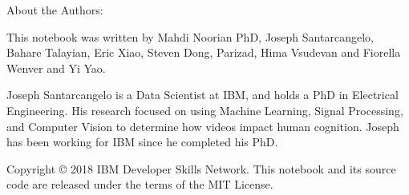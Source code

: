 \documentclass[11pt]{article}
\begin{document}
    About the Authors:

This notebook was written by Mahdi Noorian PhD, Joseph Santarcangelo,
Bahare Talayian, Eric Xiao, Steven Dong, Parizad, Hima Vsudevan and
Fiorella Wenver and Yi Yao.

Joseph Santarcangelo is a Data Scientist at IBM, and holds a PhD in
Electrical Engineering. His research focused on using Machine Learning,
Signal Processing, and Computer Vision to determine how videos impact
human cognition. Joseph has been working for IBM since he completed his
PhD.

    Copyright © 2018 IBM Developer Skills Network. This notebook and its
source code are released under the terms of the MIT License.


    
    
    
    
\end{document}
